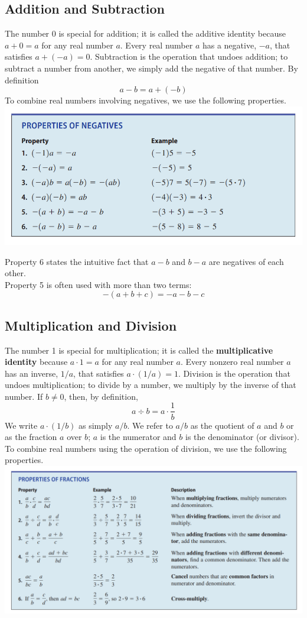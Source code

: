 \subsection{Addition and Subtraction}
The number 0 is special for addition; it is called the additive identity because $a+0=a$ for any real number $a$. Every real number $a$ has a negative, $-a$, that satisfies $a+(-a)=0$. Subtraction is the operation that undoes addition; to subtract a number from another, we simply add the negative of that number. By definition
$$
a-b=a+(-b)
$$
To combine real numbers involving negatives, we use the following properties.
\includegraphics[width=1.1\textwidth]{algebra-pre-calculus/essentials/properties_addition_subtraction.png}

Property 6 states the intuitive fact that $a-b$ and $b-a$ are negatives of each other. \\
Property 5 is often used with more than two terms:
$$
    -(a+b+c)=-a-b-c
$$

\subsection{Multiplication and Division}
The number 1 is special for multiplication; it is called the \textbf{multiplicative identity} because $a \cdot 1=a$ for any real number $a$. Every nonzero real number $a$ has an inverse, $1 / a$, that satisfies $a \cdot(1 / a)=1$. Division is the operation that undoes multiplication; to divide by a number, we multiply by the inverse of that number. If $b \neq 0$, then, by definition,
$$
a \div b=a \cdot \frac{1}{b}
$$
We write $a \cdot(1 / b)$ as simply $a / b$. We refer to $a / b$ as the quotient of $a$ and $b$ or as the fraction $a$ over $b$; $a$ is the numerator and $b$ is the denominator (or divisor). To combine real numbers using the operation of division, we use the following properties. \\
\includegraphics[width=1.1\textwidth]{algebra-pre-calculus/essentials/properties_multiplication_division.png}

